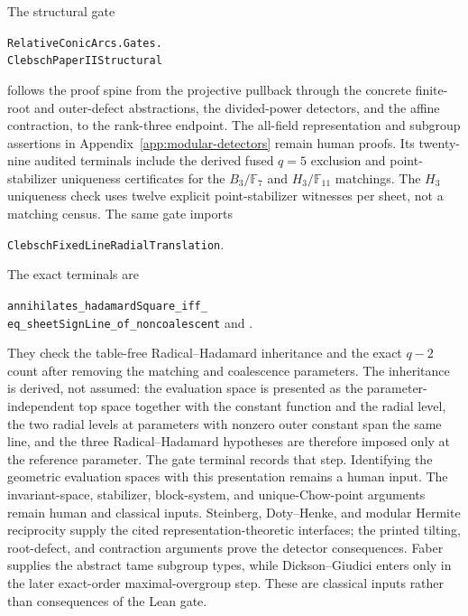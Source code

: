 \documentclass[11pt]{article}
\theoremstyle{definition}
\theoremstyle{remark}
\newcommand{\F}{\mathbb{F}}
\begin{document}
The structural gate
\begin{center}
\small\texttt{RelativeConicArcs.Gates.}\\[-2pt]
\texttt{ClebschPaperIIStructural}
\end{center}
follows the proof spine from the projective pullback through the concrete
finite-root and outer-defect abstractions, the divided-power detectors, and
the affine contraction, to the rank-three endpoint.  The all-field
representation and subgroup assertions in
Appendix~\ref{app:modular-detectors} remain human proofs.  Its twenty-nine
audited terminals include the derived fused
\(q=5\) exclusion and point-stabilizer uniqueness certificates for the
\(B_3/\F_7\) and \(H_3/\F_{11}\) matchings.  The \(H_3\) uniqueness check
uses twelve explicit point-stabilizer witnesses per sheet, not a matching
census.  The same gate imports
\begin{center}
\small\texttt{ClebschFixedLineRadialTranslation}.
\end{center}
The exact terminals are
\begin{center}\small
\texttt{annihilates\_hadamardSquare\_iff\_}\\[-2pt]
\texttt{eq\_sheetSignLine\_of\_noncoalescent}
and
.
\end{center}
They check the table-free Radical--Hadamard inheritance and the exact
\(q-2\) count after removing the matching and coalescence parameters.
The inheritance is derived, not assumed: the evaluation space is presented as
the parameter-independent top space together with the constant function and
the radial level, the two radial levels at parameters with nonzero outer
constant span the same line, and the three Radical--Hadamard hypotheses are
therefore imposed only at the reference parameter.  The gate terminal
 records that step.  Identifying the
geometric evaluation spaces with this presentation remains a human input.
The invariant-space, stabilizer, block-system, and unique-Chow-point
arguments remain human and classical inputs.  Steinberg, Doty--Henke, and
modular Hermite reciprocity supply the cited representation-theoretic
interfaces; the printed tilting, root-defect, and contraction arguments
prove the detector consequences.  Faber supplies the abstract tame subgroup
types, while Dickson--Giudici enters only in the later exact-order
maximal-overgroup step.  These are classical inputs rather than consequences
of the Lean gate.
\end{document}
